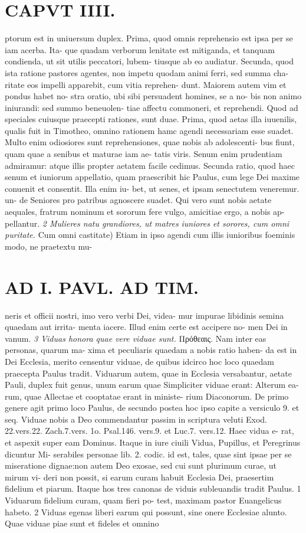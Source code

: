 \documentclass{article}
\begin{document}
\begin{pages}
\section*{CAPVT  IIII. }
\marginpar{[ p.251 ]}ptorum est in uniuersum duplex. Prima, quod omnis reprehensio est ipsa per se iam acerba. Ita- que quadam verborum lenitate est mitiganda, et tanquam condienda, ut sit utilis peccatori, lubem- tiusque ab eo audiatur. Secunda, quod ista ratione pastores agentes, non impetu quodam animi ferri, sed summa cha- ritate eos impelli apparebit, cum vitia reprehen- dunt. Maiorem autem vim et pondus habet no- stra oratio, ubi sibi persuadent homines, se a no- bis non animo iniurandi: sed summo beneuolen- tiae affectu commoneri, et reprehendi. Quod ad speciales cuiusque praecepti rationes, sunt duae. Prima, quod aetas illa iuuenilis, qualis fuit in Timotheo, omnino rationem hamc agendi necessariam esse suadet. Multo enim odiosiores sunt reprehensiones, quae nobis ab adolescenti- bus fiunt, quam quae a senibus et maturae iam ae- tatis viris. Senum enim prudentiam admiramur: atque illis propter aetatem facile cedimus. Secunda ratio, quod haec senum et iuniorum appellatio, quam praescribit hic Paulus, cum lege Dei maxime conuenit et consentit. Illa enim iu- bet, ut senes, et ipsam senectutem veneremur. un- de Seniores pro patribus agnoscere suadet. Qui vero sunt nobis aetate aequales, fratrum nominum et sororum fere vulgo, amicitiae ergo, a nobis ap- pellantur. \textit{2 Mulieres natu grandiores, ut matres} \textit{iuniores et sorores, cum omni puritate.} Cum omni castitate) Etiam in ipso agendi cum illis iunioribus foeminis modo, ne praetextu mu- 
\section*{AD I. PAVL. AD TIM. }
\marginpar{[ p.252 ]}neris et officii nostri, imo vero verbi Dei, videa- mur impurae libidinis semina quaedam aut irrita- menta iacere. Illud enim certe est accipere no- men Dei in vanum. \textit{3 Viduas honora quae vere viduae sunt.} Πρόθεαις. Nam inter eas personas, quarum ma- xima et peculiaris quaedam a nobis ratio haben- da est in Dei Ecclesia, merito censentur viduae, de quibus idcirco hoc loco quaedam praecepta Paulus tradit. Viduarum autem, quae in Ecclesia versabantur, aetate Pauli, duplex fuit genus, unum earum quae Simpliciter viduae erant: Alterum ea- rum, quae Allectae et cooptatae erant in ministe- rium Diaconorum. De primo genere agit primo loco Paulus, de secundo postea hoc ipso capite a versiculo 9. et seq. Viduae nobis a Deo commendantur passim in scriptura veluti Exod. 22.vers.22. Zach.7.vers. 1o. Psal.146. vers.9. et Luc.7. vers.12. Haec vidua e- rat, et aspexit super eam Dominus. Itaque in iure ciuili Vidua, Pupillus, et Peregrinus dicuntur Mi- serabiles personae lib. 2. codic. id est, tales, quae sint ipsae per se miseratione dignae:non autem Deo exosae, sed cui sunt plurimum curae, ut mirum vi- deri non possit, si earum curam habuit Ecclesia Dei, praesertim fidelium et piarum. Itaque hos tres canonas de viduis subleuandis tradit Paulus. 1 Viduarum fidelium curam, quam fieri po- test, maximam pastor Euangelicus habeto. 2 Viduas egenas liberi earum qui possunt, sine onere Ecclesiae alunto. Quae viduae piae sunt et fideles et omnino 

\end{pages}
\end{document}

